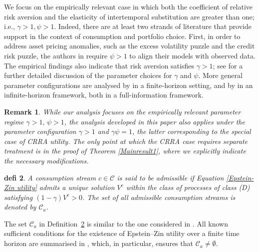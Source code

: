 \documentclass[12,reqno]{amsart}
\numberwithin{equation}{section}
\newtheorem{defi}{defi}[section]
\newtheorem{remark}[defi]{Remark}
\begin{document}
We focus on the empirically relevant case in which both the coefficient of relative risk aversion and the elasticity of intertemporal substitution are greater than one; i.e., $\gamma>1,\psi>1$. Indeed, there are at least two strands of literature that provide support in the context of consumption and portfolio choice. First, in order to address asset pricing anomalies, such as the excess volatility puzzle and the credit risk puzzle, the authors in \cite{benzoni2011explaining,bhamra2010levered} require $\psi>1$ to align their models with observed data. The empirical findings also indicate that risk aversion satisfies $\gamma>1$; see \cite[on p.228]{xing2017consumption} for a further detailed discussion of the parameter choices for $\gamma$ and $\psi$. More general parameter configurations are analysed by \cite{matoussi2018convex} in a finite-horizon setting, and by \cite{herdegen2023infiniteI,shigeta2026economic} in an infinite-horizon framework, both in a full-information framework.
\begin{remark}\label{Special CRRA utility}
	While our analysis focuses on the empirically relevant parameter regime $\gamma>1,\,\psi>1$, the analysis developed in this paper also applies under the parameter configuration $\gamma>1$ and $\gamma\psi=1$, the latter corresponding to the special case of CRRA utility. The only point at which the CRRA case requires separate treatment is in the proof of Theorem \ref{Mainresult1}, where we explicitly indicate the necessary modifications.
\end{remark}
\begin{defi}\label{Admissible consumption}
	A consumption stream $c\in\mathcal{C}$ is said to be \textit{admissible} if Equation \eqref{Epstein-Zin utility} admits a unique solution $V^{c}$ within the class of processes of class (D) satisfying $(1-\gamma)V^{c}>0$. The set of all admissible consumption streams is denoted by $\mathcal{C}_{a}$.
\end{defi}
The set $\mathcal{C}_{a}$ in Definition~\ref{Admissible consumption} is similar to the one considered in \cite{herdegen2023infiniteI,matoussi2018convex}. All known sufficient conditions for the existence of Epstein–Zin utility over a finite time horizon are summarised in \cite[Prop.~2.1]{matoussi2018convex}, which, in particular, ensures that $\mathcal{C}_{a}\ne\emptyset$.
\end{document}
